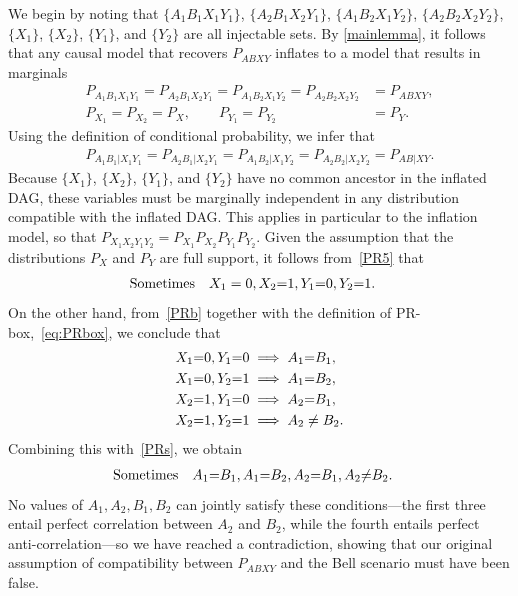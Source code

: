 We begin by noting that $\{A_1 B_1 X_1 Y_1\}$, $\{A_2 B_1 X_2 Y_1\}$, $\{A_1 B_2 X_1 Y_2\}$, $\{A_2 B_2 X_2 Y_2\}$, $\{X_1\}$, $\{X_2\}$, $\{Y_1\}$, and $\{Y_2\}$ are all injectable sets. 
By \cref{mainlemma}, it follows that any causal model that recovers $P_{ABXY}$ inflates to a model that results in marginals
\begin{align}
P_{A_1 B_1 X_1 Y_1}=P_{A_2 B_1 X_2 Y_1}=P_{A_1 B_2 X_1 Y_2}=P_{A_2 B_2 X_2 Y_2}&=P_{A B X Y},\label{PR1}\\
P_{X_1}=P_{X_2}=P_X, \qquad P_{Y_1}=P_{Y_2}&=P_Y.\label{PR5}
\end{align}
Using the definition of conditional probability, we infer that
\begin{align}
P_{A_1 B_1 |X_1 Y_1}=P_{A_2 B_1 |X_2 Y_1}=P_{A_1 B_2 |X_1 Y_2}=P_{A_2 B_2 |X_2 Y_2}=P_{A B |X Y}\label{PRb}.
\end{align}
Because $\{X_1\}$, $\{X_2\}$, $\{Y_1\}$, and $\{Y_2\}$ have no common ancestor in the inflated DAG, these variables must be marginally independent in any distribution compatible with the inflated DAG. This applies in particular to the inflation model, so that $P_{X_1 X_2 Y_1 Y_2} = P_{X_1} P_{X_2} P_{Y_1} P_{Y_2}$. Given the assumption that the distributions $P_{X}$ and $P_{Y}$ are full support, it follows from~\cref{PR5} that
\begin{align}\label{PRs}
\text{Sometimes} \quad &X_1 = 0, X_2 \mathord{=}1, Y_1 \mathord{=} 0, Y_2 \mathord{=} 1.
\end{align} 
On the other hand, from~\cref{PRb} together with  the definition of PR-box,~\cref{eq:PRbox}, we conclude that 
\begin{align} 
\begin{split}
\label{PRsi}
&X_1 \mathord{=} 0, Y_1 \mathord{=} 0 \implies A_1\mathord{=} B_1,\\
&X_1 \mathord{=} 0, Y_2 \mathord{=} 1 \implies A_1\mathord{=} B_2,\\
&X_2 \mathord{=} 1, Y_1 \mathord{=} 0 \implies A_2\mathord{=} B_1,\\
&X_2 \mathord{=} 1, Y_2 \mathord{=} 1 \implies A_2\ne B_2.
\end{split}
\end{align}
Combining this with~\cref{PRs}, we obtain
\begin{align}
\text{Sometimes} \quad &A_1\mathord{=} B_1, A_1\mathord{=} B_2, A_2\mathord{=} B_1, A_2\mathord{\ne}B_2.
\end{align} 
No values of $A_1, A_2, B_1, B_2$ can jointly satisfy these conditions---the first three entail perfect correlation between $A_2$ and $B_2$, while the fourth entails perfect anti-correlation---so we have reached a contradiction, showing that our original assumption of compatibility between $P_{ABXY}$ and the Bell scenario must have been false.

